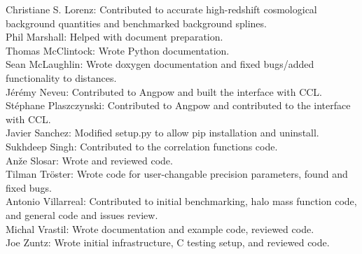Christiane S. Lorenz: Contributed to accurate high-redshift cosmological background quantities and benchmarked background splines. \\
Phil Marshall: Helped with document preparation. \\
Thomas McClintock: Wrote Python documentation. \\
Sean McLaughlin: Wrote doxygen documentation and fixed bugs/added functionality to distances. \\
J\'er\'emy Neveu: Contributed to Angpow and built the interface with CCL. \\
St\'ephane Plaszczynski: Contributed to Angpow and contributed to the interface with CCL. \\
Javier Sanchez: Modified setup.py to allow pip installation and uninstall. \\
Sukhdeep Singh: Contributed to the correlation functions code. \\
An\v{z}e Slosar: Wrote and reviewed code. \\
Tilman Tr\"oster: Wrote code for user-changable precision parameters, found and fixed bugs. \\
Antonio Villarreal: Contributed to initial benchmarking, halo mass function code, and general code and issues review. \\
Michal Vrastil: Wrote documentation and example code, reviewed code. \\
Joe Zuntz: Wrote initial infrastructure, C testing setup, and reviewed code. \\
